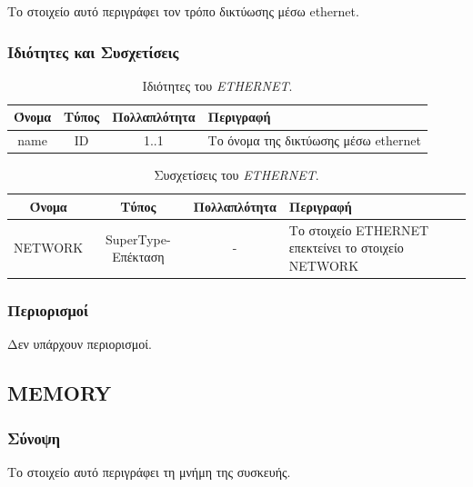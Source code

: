 \noindent Το στοιχείο αυτό περιγράφει τον τρόπο δικτύωσης μέσω ethernet.

\subsubsection*{Ιδιότητες και Συσχετίσεις}

\begin{table}[H]
	\begin{center}
		\caption{Ιδιότητες του \textit{ETHERNET}.}
		\label{tab:ethernet1}
		\begin{tabular}{ | c | c | c| m{5.5cm} | }
			\hline
			\rowcolor{Gray}
			Όνομα & Τύπος & Πολλαπλότητα & Περιγραφή \\
			\hline
			name & ID & 1..1 & Το όνομα της δικτύωσης μέσω ethernet \\
			\hline
		\end{tabular}
	\end{center}
\end{table}

\begin{table}[H]
	\begin{center}
		\caption{Συσχετίσεις του \textit{ETHERNET}.}
		\label{tab:ethernet2}
		\begin{tabular}{ | c | c | c| m{5.5cm} | }
			\hline
			\rowcolor{Gray}
			Όνομα & Τύπος & Πολλαπλότητα & Περιγραφή \\
			\hline
			NETWORK & SuperType-Επέκταση & - &  Το στοιχείο ETHERNET επεκτείνει το στοιχείο NETWORK \\
			\hline
		\end{tabular}
	\end{center}
\end{table}

\subsubsection*{Περιορισμοί}

\noindent Δεν υπάρχουν περιορισμοί.

\subsection{MEMORY}
\label{subsec:memory}

\subsubsection*{Σύνοψη}

\noindent Το στοιχείο αυτό περιγράφει τη μνήμη της συσκευής.

